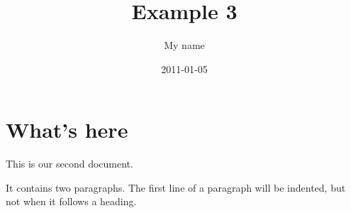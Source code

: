 ﻿\documentclass[a4paper,11pt]{article}
\title{Example 3}
\author{My name}
\date{2011-01-05}
\begin{document}
\maketitle
\section{What's here}
This        is   our
second document.

It contains two paragraphs. The first line of a paragraph will be
indented, but not when it follows a heading.
\end{document}
